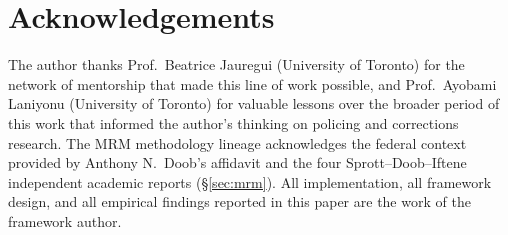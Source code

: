 \documentclass[11pt,a4paper]{article}
\theoremstyle{plain}
\theoremstyle{definition}
\theoremstyle{remark}
\begin{document}
\section*{Acknowledgements}

The author thanks Prof.\ Beatrice Jauregui (University of Toronto)
for the network of mentorship that made this line of work
possible, and Prof.\ Ayobami Laniyonu (University of Toronto) for
valuable lessons over the broader period of this work that
informed the author's thinking on policing and corrections
research. The MRM methodology lineage acknowledges the federal
context provided by Anthony N.\ Doob's affidavit and the four
Sprott--Doob--Iftene independent academic reports
(\S\ref{sec:mrm}). All implementation, all framework design, and
all empirical findings reported in this paper are the work of the
framework author.
\end{document}

